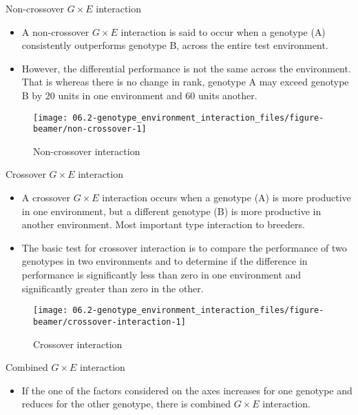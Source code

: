 \documentclass[11pt,dvipsnames,ignorenonframetext,aspectratio=169]{beamer}
\providecommand{\tightlist}{%
  \setlength{\itemsep}{0pt}\setlength{\parskip}{0pt}}
\begin{document}
\begin{frame}{Non-crossover \(G \times E\) interaction}
\protect\hypertarget{non-crossover-g-times-e-interaction}{}
\begin{itemize}
\tightlist
\item
  A non-crossover \(G \times E\) interaction is said to occur when a
  genotype (A) consistently outperforms genotype B, across the entire
  test environment.
\item
  However, the differential performance is not the same across the
  environment. That is whereas there is no change in rank, genotype A
  may exceed genotype B by 20 units in one environment and 60 units
  another.
\end{itemize}

\begin{figure}
\texttt{[image: 06.2-genotype\_environment\_interaction\_files/figure-beamer/non-crossover-1]} \caption{Non-crossover interaction}\label{fig:non-crossover}
\end{figure}
\end{frame}

\begin{frame}{Crossover \(G \times E\) interaction}
\protect\hypertarget{crossover-g-times-e-interaction}{}
\begin{itemize}
\tightlist
\item
  A crossover \(G \times E\) interaction occurs when a genotype (A) is
  more productive in one environment, but a different genotype (B) is
  more productive in another environment. Most important type
  interaction to breeders.
\item
  The basic test for crossover interaction is to compare the performance
  of two genotypes in two environments and to determine if the
  difference in performance is significantly less than zero in one
  environment and significantly greater than zero in the other.
\end{itemize}

\begin{figure}
\texttt{[image: 06.2-genotype\_environment\_interaction\_files/figure-beamer/crossover-interaction-1]} \caption{Crossover interaction}\label{fig:crossover-interaction}
\end{figure}
\end{frame}

\begin{frame}{Combined \(G \times E\) interaction}
\protect\hypertarget{combined-g-times-e-interaction}{}
\begin{itemize}
\tightlist
\item
  If the one of the factors considered on the axes increases for one
  genotype and reduces for the other genotype, there is combined
  \(G \times E\) interaction.
\end{itemize}
\end{frame}
\end{document}

